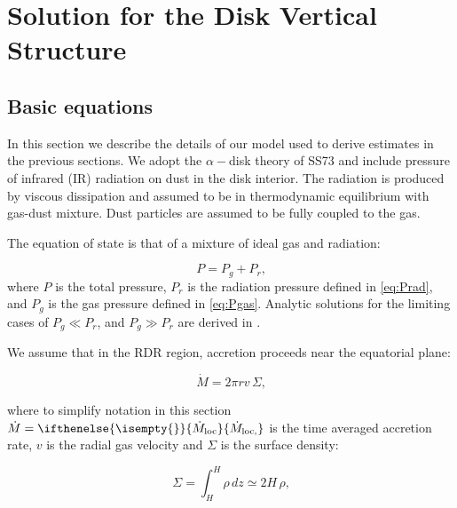\documentclass[12pt,english,preprint]{aastex}
\newcommand{\su}[2]{#1_{\rm #2}}
\newcommand{\mdt}[1][]{ 
  \ifthenelse{\isempty{#1}}
  {\dot{M}_{\rm loc}}
  { {\dot M}_{\rm{loc},{#1}} } 
  } %
\newcommand{\Mdt}[1][]{ 
    \ifthenelse{\isempty{#1}}
    {\dot{M}_{}}
    { {\dot M}_{{#1}} } 
} %
\begin{document}


\section{Solution for the Disk Vertical Structure}\label{sec:Solution}
\subsection{Basic equations}

In this section we describe the details of our model used to derive estimates 
in the previous sections. 
We adopt the $\alpha-$disk theory of SS73 and include pressure of infrared (IR) radiation on dust in the disk 
interior. The radiation is produced by viscous dissipation and assumed to be in thermodynamic 
equilibrium with gas-dust mixture. Dust particles are assumed to be fully coupled to the gas. 

The equation of state is that of a mixture of ideal gas and radiation:

\begin{equation}
P=P_g+P_r\mbox{,}\label{eq:Ptot}
\end{equation}
where $P$ is the total pressure, $P_r$ is the radiation pressure defined 
in \eqref{eq:Prad}, and  $P_{g}$ is the gas pressure defined in \eqref{eq:Pgas}.
Analytic solutions for the
limiting cases of $P_g \ll P_r$, and $P_g \gg P_r$ are derived in
\citep{ShakuraSunyaev73}.

We assume that in the RDR region, accretion proceeds near the equatorial plane:

\begin{equation}
\dot{M}=2\pi r v\,\Sigma\mbox{,}\label{eq:MdotEq}
\end{equation}

\noindent where to simplify notation in this section $\dot{M}=\mdt$ is the time averaged accretion rate, $v$ is the radial
gas velocity and $\Sigma$ is the surface density: 

\begin{equation}
\Sigma=\int_H^H\rho\,dz\simeq2 H\,\rho\mbox{,}\label{eq:SigmaS}
\end{equation}
\end{document}
